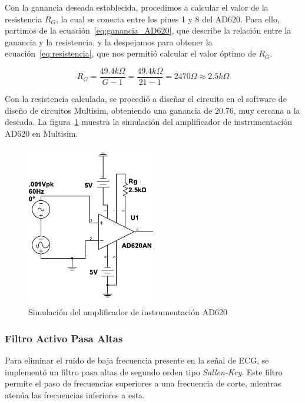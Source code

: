         Con la ganancia deseada establecida, procedimos a calcular el valor de la resistencia $R_G$, la cual se conecta entre los pines 1 y 8 del AD620. Para ello, partimos de la ecuación~\ref{eq:ganancia_AD620}, que describe la relación entre la ganancia y la resistencia, y la despejamos para obtener la ecuación~\ref{eq:resistencia}, que nos permitió calcular el valor óptimo de $R_G$.

        \begin{equation}
            \label{eq:resistencia}
            R_G = \frac{49.4 k\Omega}{G - 1} = \frac{49.4 k\Omega}{21 - 1} = 2470 \Omega \approx 2.5 k\Omega
        \end{equation}

        Con la resistencia calculada, se procedió a diseñar el circuito en el software de diseño de circuitos Multisim, obteniendo una ganancia de 20.76, muy cercana a la deseada. La figura~\ref{fig:Simulacion_AD620} muestra la simulación del amplificador de instrumentación AD620 en Multisim.

        \begin{figure}[H]
            \centering
            \includegraphics[width=0.5\textwidth]{img/Desarrollo/multisim_AD620AN.png}
            \caption[Simulación del amplificador de instrumentación AD620.]{Simulación del amplificador de instrumentación AD620\footnotemark}
            \label{fig:Simulacion_AD620}
        \end{figure}

        \subsubsection{Filtro Activo Pasa Altas}
        Para eliminar el ruido de baja frecuencia presente en la señal de ECG, se implementó un filtro pasa altas de segundo orden tipo \textit{Sallen-Key}. Este filtro permite el paso de frecuencias superiores a una frecuencia de corte, mientras atenúa las frecuencias inferiores a esta.


